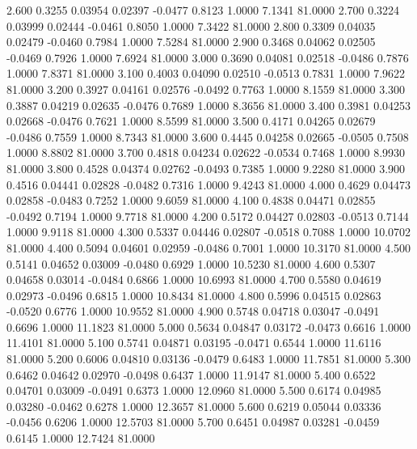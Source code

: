    2.600   0.3255   0.03954   0.02397  -0.0477   0.8123   1.0000   7.1341  81.0000
   2.700   0.3224   0.03999   0.02444  -0.0461   0.8050   1.0000   7.3422  81.0000
   2.800   0.3309   0.04035   0.02479  -0.0460   0.7984   1.0000   7.5284  81.0000
   2.900   0.3468   0.04062   0.02505  -0.0469   0.7926   1.0000   7.6924  81.0000
   3.000   0.3690   0.04081   0.02518  -0.0486   0.7876   1.0000   7.8371  81.0000
   3.100   0.4003   0.04090   0.02510  -0.0513   0.7831   1.0000   7.9622  81.0000
   3.200   0.3927   0.04161   0.02576  -0.0492   0.7763   1.0000   8.1559  81.0000
   3.300   0.3887   0.04219   0.02635  -0.0476   0.7689   1.0000   8.3656  81.0000
   3.400   0.3981   0.04253   0.02668  -0.0476   0.7621   1.0000   8.5599  81.0000
   3.500   0.4171   0.04265   0.02679  -0.0486   0.7559   1.0000   8.7343  81.0000
   3.600   0.4445   0.04258   0.02665  -0.0505   0.7508   1.0000   8.8802  81.0000
   3.700   0.4818   0.04234   0.02622  -0.0534   0.7468   1.0000   8.9930  81.0000
   3.800   0.4528   0.04374   0.02762  -0.0493   0.7385   1.0000   9.2280  81.0000
   3.900   0.4516   0.04441   0.02828  -0.0482   0.7316   1.0000   9.4243  81.0000
   4.000   0.4629   0.04473   0.02858  -0.0483   0.7252   1.0000   9.6059  81.0000
   4.100   0.4838   0.04471   0.02855  -0.0492   0.7194   1.0000   9.7718  81.0000
   4.200   0.5172   0.04427   0.02803  -0.0513   0.7144   1.0000   9.9118  81.0000
   4.300   0.5337   0.04446   0.02807  -0.0518   0.7088   1.0000  10.0702  81.0000
   4.400   0.5094   0.04601   0.02959  -0.0486   0.7001   1.0000  10.3170  81.0000
   4.500   0.5141   0.04652   0.03009  -0.0480   0.6929   1.0000  10.5230  81.0000
   4.600   0.5307   0.04658   0.03014  -0.0484   0.6866   1.0000  10.6993  81.0000
   4.700   0.5580   0.04619   0.02973  -0.0496   0.6815   1.0000  10.8434  81.0000
   4.800   0.5996   0.04515   0.02863  -0.0520   0.6776   1.0000  10.9552  81.0000
   4.900   0.5748   0.04718   0.03047  -0.0491   0.6696   1.0000  11.1823  81.0000
   5.000   0.5634   0.04847   0.03172  -0.0473   0.6616   1.0000  11.4101  81.0000
   5.100   0.5741   0.04871   0.03195  -0.0471   0.6544   1.0000  11.6116  81.0000
   5.200   0.6006   0.04810   0.03136  -0.0479   0.6483   1.0000  11.7851  81.0000
   5.300   0.6462   0.04642   0.02970  -0.0498   0.6437   1.0000  11.9147  81.0000
   5.400   0.6522   0.04701   0.03009  -0.0491   0.6373   1.0000  12.0960  81.0000
   5.500   0.6174   0.04985   0.03280  -0.0462   0.6278   1.0000  12.3657  81.0000
   5.600   0.6219   0.05044   0.03336  -0.0456   0.6206   1.0000  12.5703  81.0000
   5.700   0.6451   0.04987   0.03281  -0.0459   0.6145   1.0000  12.7424  81.0000

